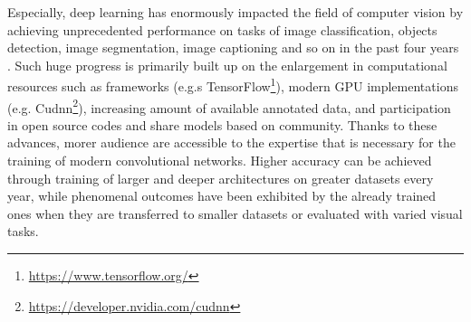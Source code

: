 
    Especially, deep learning has enormously impacted the field of computer vision by achieving unprecedented performance on tasks of image classification, objects detection, image segmentation, image captioning and so on in the past four years \cite{DBLP:journals/corr/GuWKMSSLWW15}. Such huge progress is primarily built up on the enlargement  in computational resources such as frameworks (e.g.s TensorFlow\footnote{\url{https://www.tensorflow.org/}}), modern GPU implementations (e.g.  Cudnn\footnote{\url{https://developer.nvidia.com/cudnn}}), increasing amount of available annotated data, and participation in open source codes and share models based on community. Thanks to these advances, morer audience are accessible to the expertise that is necessary for the training of modern convolutional networks. Higher accuracy can be achieved through training of larger and deeper architectures on greater datasets every year, while phenomenal outcomes have been exhibited by the  already trained ones when they are transferred to smaller datasets or evaluated with varied visual tasks. \\

